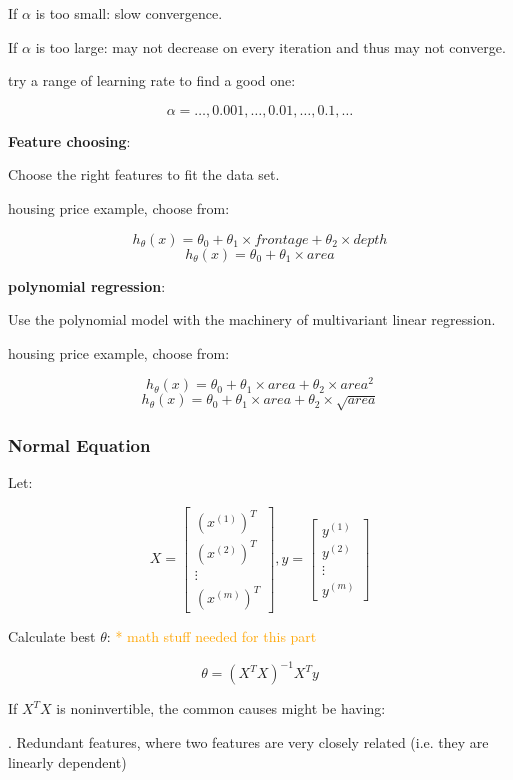 \documentclass{article}
\begin{document}
\noindent If \(\alpha\) is too small: slow convergence.

\noindent If \(\alpha\) is too large: may not decrease on every iteration and thus may not converge.

\noindent try a range of learning rate to find a good one:

\[\alpha = \dots, 0.001, \dots, 0.01, \dots, 0.1, \dots\]

\noindent \textbf{Feature choosing}:

\noindent Choose the right features to fit the data set.

\noindent housing price example, choose from:

\[h_{\theta}(x) = \theta_0 + \theta_1 \times frontage + \theta_2 \times depth\]
\[h_{\theta}(x) = \theta_0 + \theta_1 \times area\]

\noindent \textbf{polynomial regression}:

\noindent Use the polynomial model with the machinery of multivariant linear regression.

\noindent housing price example, choose from:

\[h_{\theta}(x) = \theta_0 + \theta_1 \times area + \theta_2 \times area^2\]
\[h_{\theta}(x) = \theta_0 + \theta_1 \times area + \theta_2 \times \sqrt{area}\]

\subsubsection{Normal Equation}

\noindent Let:

\[
X = 
\begin{bmatrix}
(x^{(1)})^T\\
(x^{(2)})^T\\
\vdots\\
(x^{(m)})^T
\end{bmatrix}
,
y = 
\begin{bmatrix}
y^{(1)}\\
y^{(2)}\\
\vdots\\
y^{(m)}
\end{bmatrix}
\]

\noindent Calculate best \(\theta\): \textcolor{orange}{ * math stuff needed for this part}

\[
\theta = (X^TX)^{-1}X^Ty
\]

\noindent If \(X^TX\) is noninvertible, the common causes might be having:

. Redundant features, where two features are very closely related (i.e. they are linearly dependent)
\end{document}
